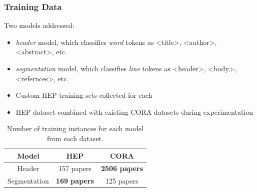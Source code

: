 \documentclass{beamer}
\begin{document}
\begin{frame}
\frametitle{Training Data}

Two models addressed:
\begin{itemize}
\item \emph{header} model, which classifies \emph{word} tokens as <title>, <author>, <abstract>, etc.
\item \emph{segmentation} model, which classifies \emph{line} tokens as <header>, <body>, <refernces>, etc.
\item Custom HEP training sets collected for each
\item HEP dataset combined with existing CORA datasets during experimentation

\end{itemize}

\begin{table}[h]
\begin{center}
\begin{tabular}{|c|c|c|}
\hline
Model & HEP & CORA \\
\hline
Header & 157 papers & \textbf{2506 papers} \\
\hline
Segmentation & \textbf{169 papers} & 125 papers \\
\hline
\end{tabular}
\caption[Number of training instances for each model from each dataset.]{Number of training instances for each model from each dataset.}
\end{center}
\end{table}
\end{frame}

\end{document}
